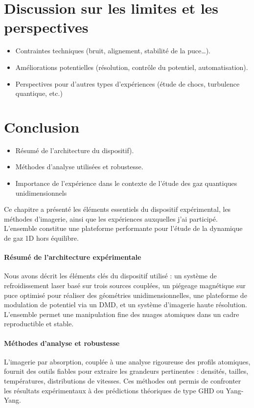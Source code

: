 \section{Discussion sur les limites et les perspectives}
\begin{itemize}
    \item Contraintes techniques (bruit, alignement, stabilité de la puce…).
    \item Améliorations potentielles (résolution, contrôle du potentiel, automatisation).
    \item Perspectives pour d’autres types d’expériences (étude de chocs, turbulence quantique, etc.)
\end{itemize}

\section*{Conclusion}
\begin{itemize}
    \item Résumé de l’architecture du dispositif).
    \item Méthodes d’analyse utilisées et robustesse.
    \item Importance de l’expérience dans le contexte de l’étude des gaz quantiques unidimensionnels
\end{itemize}
Ce chapitre a présenté les éléments essentiels du dispositif expérimental, les méthodes d’imagerie, ainsi que les expériences auxquelles j’ai participé. L’ensemble constitue une plateforme performante pour l’étude de la dynamique de gaz 1D hors équilibre.

\paragraph{Résumé de l’architecture expérimentale}  
Nous avons décrit les éléments clés du dispositif utilisé : un système de refroidissement laser basé sur trois sources couplées, un piégeage magnétique sur puce optimisé pour réaliser des géométries unidimensionnelles, une plateforme de modulation de potentiel via un DMD, et un système d’imagerie haute résolution. L’ensemble permet une manipulation fine des nuages atomiques dans un cadre reproductible et stable.

\paragraph{Méthodes d’analyse et robustesse}  
L’imagerie par absorption, couplée à une analyse rigoureuse des profils atomiques, fournit des outils fiables pour extraire les grandeurs pertinentes : densités, tailles, températures, distributions de vitesses. Ces méthodes ont permis de confronter les résultats expérimentaux à des prédictions théoriques de type GHD ou Yang-Yang.

